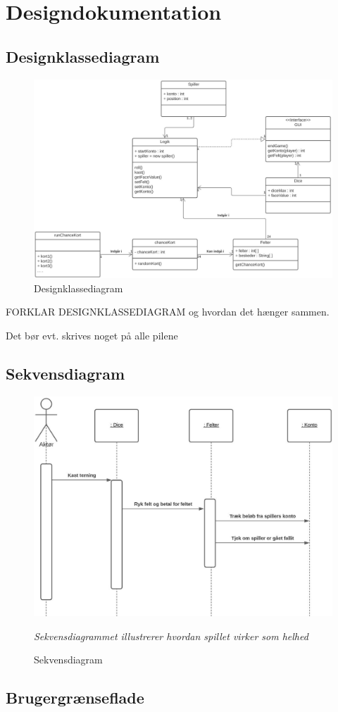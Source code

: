 \section{Designdokumentation}
\subsection{Designklassediagram}
\begin{figure}[H]
            \centering
            \includegraphics[width=14cm]{figures/designKlasseDiagram.JPG}
            \caption{Designklassediagram}
        \end{figure}

FORKLAR DESIGNKLASSEDIAGRAM og hvordan det hænger sammen.

Det bør evt. skrives noget på alle pilene
        
\subsection{Sekvensdiagram}
    \begin{figure}[H]
        \centering
        \includegraphics[width=15cm]{figures/systemSekvensDiagram.JPG}
        \caption{Sekvensdiagram}
        \emph{Sekvensdiagrammet illustrerer hvordan spillet virker som helhed}
    \end{figure}

\subsection{Brugergrænseflade}
